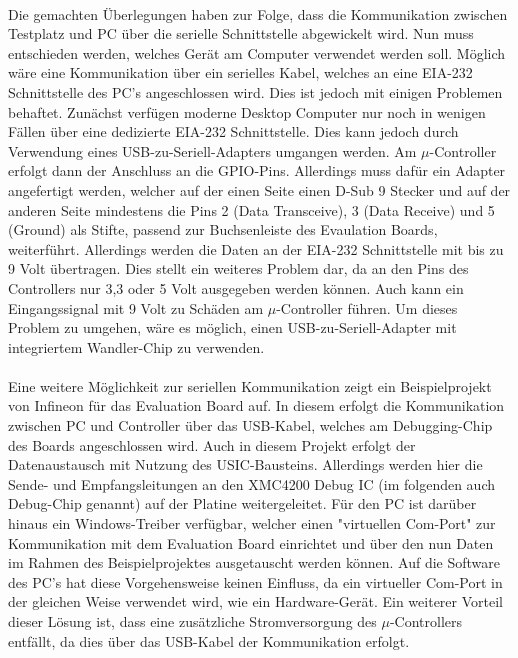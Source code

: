 \paragraph{}
Die gemachten Überlegungen haben zur Folge, dass die Kommunikation zwischen Testplatz und PC über die serielle Schnittstelle abgewickelt wird. Nun muss entschieden werden, welches Gerät am Computer verwendet werden soll. Möglich wäre eine Kommunikation über ein serielles Kabel, welches an eine EIA-232 Schnittstelle des PC's angeschlossen wird. Dies ist jedoch mit einigen Problemen behaftet. Zunächst verfügen moderne Desktop Computer nur noch in wenigen Fällen über eine dedizierte EIA-232 Schnittstelle. Dies kann jedoch durch Verwendung eines USB-zu-Seriell-Adapters umgangen werden. Am $\mu$-Controller erfolgt dann der Anschluss an die GPIO-Pins. Allerdings muss dafür ein Adapter angefertigt werden, welcher auf der einen Seite einen D-Sub 9 Stecker und auf der anderen Seite mindestens die Pins 2 (Data Transceive), 3 (Data Receive) und 5 (Ground) als Stifte, passend zur Buchsenleiste des Evaulation Boards, weiterführt. Allerdings werden die Daten an der EIA-232 Schnittstelle mit bis zu 9 Volt übertragen. Dies stellt ein weiteres Problem dar, da an den Pins des Controllers nur 3,3 oder 5 Volt ausgegeben werden können. Auch kann ein Eingangssignal mit 9 Volt zu Schäden am $\mu$-Controller führen. Um dieses Problem zu umgehen, wäre es möglich, einen USB-zu-Seriell-Adapter mit integriertem Wandler-Chip zu verwenden.
\paragraph{}
Eine weitere Möglichkeit zur seriellen Kommunikation zeigt ein Beispielprojekt von Infineon für das Evaluation Board auf. In diesem erfolgt die Kommunikation zwischen PC und Controller über das USB-Kabel, welches am Debugging-Chip des Boards angeschlossen wird. Auch in diesem Projekt erfolgt der Datenaustausch mit Nutzung des USIC-Bausteins. Allerdings werden hier die Sende- und Empfangsleitungen an den XMC4200 Debug IC (im folgenden auch Debug-Chip genannt) auf der Platine weitergeleitet. Für den PC ist darüber hinaus ein Windows-Treiber verfügbar, welcher einen "virtuellen Com-Port" zur Kommunikation mit dem Evaluation Board einrichtet und über den nun Daten im Rahmen des Beispielprojektes ausgetauscht werden können. Auf die Software des PC's hat diese Vorgehensweise keinen Einfluss, da ein virtueller Com-Port in der gleichen Weise verwendet wird, wie ein Hardware-Gerät. Ein weiterer Vorteil dieser Lösung ist, dass eine zusätzliche Stromversorgung des $\mu$-Controllers entfällt, da dies über das USB-Kabel der Kommunikation erfolgt.
